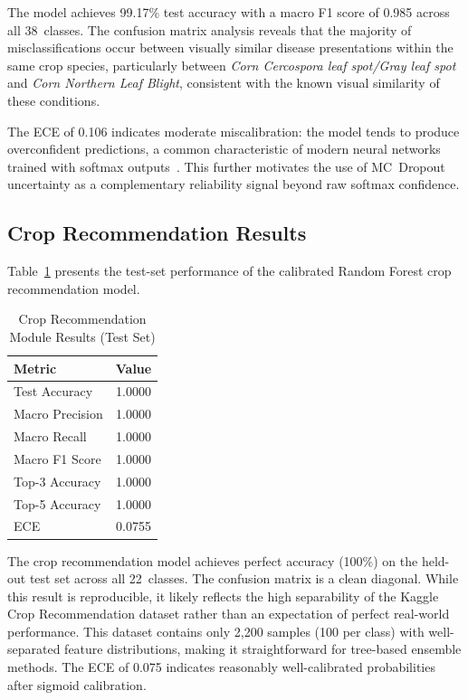 \documentclass[conference]{IEEEtran}
\begin{document}
The model achieves 99.17\% test accuracy with a macro F1 score of 0.985 across all 38~classes. The confusion matrix analysis reveals that the majority of misclassifications occur between visually similar disease presentations within the same crop species, particularly between \textit{Corn Cercospora leaf spot/Gray leaf spot} and \textit{Corn Northern Leaf Blight}, consistent with the known visual similarity of these conditions.

The ECE of 0.106 indicates moderate miscalibration: the model tends to produce overconfident predictions, a common characteristic of modern neural networks trained with softmax outputs~\cite{guo2017calibration}. This further motivates the use of MC~Dropout uncertainty as a complementary reliability signal beyond raw softmax confidence.

\subsection{Crop Recommendation Results}

Table~\ref{tab:crop_results} presents the test-set performance of the calibrated Random Forest crop recommendation model.

\begin{table}[htbp]
  \centering
  \caption{Crop Recommendation Module Results (Test Set)}
  \label{tab:crop_results}
  \begin{tabular}{lc}
    \toprule
    \textbf{Metric} & \textbf{Value} \\
    \midrule
    Test Accuracy           & 1.0000 \\
    Macro Precision         & 1.0000 \\
    Macro Recall            & 1.0000 \\
    Macro F1 Score          & 1.0000 \\
    Top-3 Accuracy          & 1.0000 \\
    Top-5 Accuracy          & 1.0000 \\
    ECE                     & 0.0755 \\
    \bottomrule
  \end{tabular}
\end{table}

The crop recommendation model achieves perfect accuracy (100\%) on the held-out test set across all 22~classes. The confusion matrix is a clean diagonal. While this result is reproducible, it likely reflects the high separability of the Kaggle Crop Recommendation dataset rather than an expectation of perfect real-world performance. This dataset contains only 2,200 samples (100 per class) with well-separated feature distributions, making it straightforward for tree-based ensemble methods. The ECE of 0.075 indicates reasonably well-calibrated probabilities after sigmoid calibration.
\end{document}
